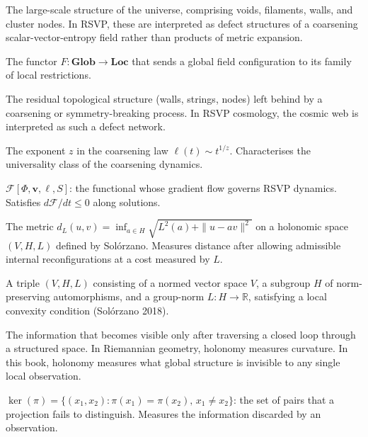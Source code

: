 \begin{description}[leftmargin=2.5cm, style=nextline]
\item[Cosmic web]
  The large-scale structure of the universe, comprising voids,
  filaments, walls, and cluster nodes.
  In RSVP, these are interpreted as defect structures of a
  coarsening scalar-vector-entropy field rather than products
  of metric expansion.

\item[Decomposition functor]
  The functor $F : \mathbf{Glob} \to \mathbf{Loc}$ that sends a
  global field configuration to its family of local restrictions.

\item[Defect network]
  The residual topological structure (walls, strings, nodes)
  left behind by a coarsening or symmetry-breaking process.
  In RSVP cosmology, the cosmic web is interpreted as such a
  defect network.

\item[Dynamic exponent]
  The exponent $z$ in the coarsening law $\ell(t) \sim t^{1/z}$.
  Characterises the universality class of the coarsening
  dynamics.

\item[Free-energy functional]
  $\mathcal{F}[\Phi, \mathbf{v}, \ell, S]$: the functional whose
  gradient flow governs RSVP dynamics.
  Satisfies $d\mathcal{F}/dt \leq 0$ along solutions.

\item[Holonomic metric]
  The metric $d_L(u,v) = \inf_{a\in H}\sqrt{L^2(a)+\|u-av\|^2}$
  on a holonomic space $(V, H, L)$ defined by Solórzano.
  Measures distance after allowing admissible internal
  reconfigurations at a cost measured by $L$.

\item[Holonomic space]
  A triple $(V, H, L)$ consisting of a normed vector space $V$,
  a subgroup $H$ of norm-preserving automorphisms, and a
  group-norm $L : H \to \mathbb{R}$, satisfying a local
  convexity condition (Solórzano 2018).

\item[Holonomy]
  The information that becomes visible only after traversing a
  closed loop through a structured space.
  In Riemannian geometry, holonomy measures curvature.
  In this book, holonomy measures what global structure is
  invisible to any single local observation.

\item[Kernel]
  $\ker(\pi) = \{(x_1,x_2) : \pi(x_1)=\pi(x_2),\, x_1\neq x_2\}$:
  the set of pairs that a projection fails to distinguish.
  Measures the information discarded by an observation.


\end{description}
